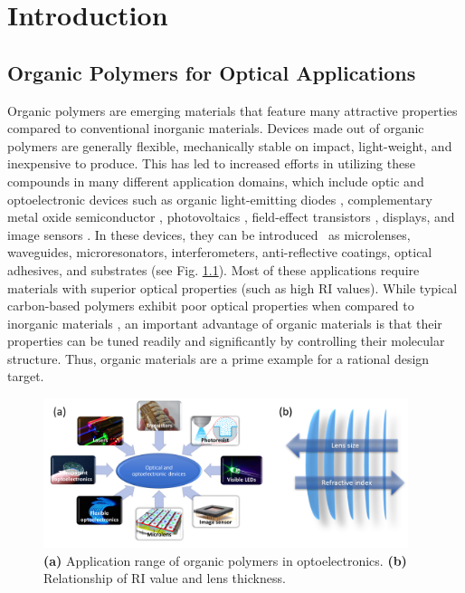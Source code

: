 \chapter{Introduction} \label{chapter1:introduction}

\section{\sloppy Organic Polymers for Optical Applications}

Organic polymers are emerging materials that feature many attractive properties compared to conventional inorganic materials. Devices made out of organic polymers are generally flexible, mechanically stable on impact, light-weight, and inexpensive to produce. This has led to increased efforts in utilizing these compounds in many different application domains, which include optic and optoelectronic devices such as organic light-emitting diodes \cite{ThejoKalyani2012}, complementary metal oxide semiconductor \cite{Nakagawa2010}, photovoltaics \cite{Hachmann2011}, field-effect transistors \cite{Sirringhaus2009}, displays, and image sensors \cite{Angione2011}. In these devices, they can be introduced \insitu\ as microlenses, waveguides, microresonators, interferometers, anti-reflective coatings, optical adhesives, and substrates (see Fig. \ref{fig:HRIP_apps}).
Most of these applications require materials with superior optical properties (such as high RI values). While typical carbon-based polymers exhibit poor optical properties when compared to inorganic materials \cite{Liu2009}, an important advantage of organic materials is that their properties can be tuned readily and significantly by controlling their molecular structure. Thus, organic materials are a prime example for a rational design target.
\begin{figure}[htbp]
\centering
\includegraphics[width=0.95\textwidth]{Chapter-1/Figures/HRIP_apps.png}
\caption{\textbf{(a)} Application range of organic polymers in optoelectronics. \textbf{(b)} Relationship of RI value and lens thickness.}
\label{fig:HRIP_apps}
\end{figure}

